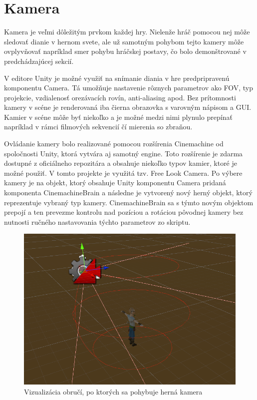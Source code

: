 \documentclass[slovak, master]{diploma}
\begin{document}
\section{Kamera}
\label{sec:Camera}
Kamera je veľmi dôležitým prvkom každej hry. Nielenže hráč pomocou nej môže sledovať dianie v hernom svete, ale už samotným pohybom tejto kamery môže ovplyvňovať napríklad smer pohybu hráčskej postavy, čo bolo demonštrované v predchádzajúcej sekcií. 

V editore Unity je možné využiť na snímanie diania v hre predpripravenú komponentu Camera. Tá umožňuje nastavenie rôznych parametrov ako FOV, typ projekcie, vzdialenosť orezávacích rovín, anti-aliasing apod. Bez prítomnosti kamery v scéne je renderovaná iba čierna obrazovka s varovným nápisom a GUI. Kamier v scéne môže byť niekoľko a je možné medzi nimi plynulo prepínať napríklad v rámci filmových sekvencií čí mierenia so zbraňou.

Ovládanie kamery bolo realizované pomocou rozšírenia Cinemachine od spoločnosti Unity, ktorá vytvára aj samotný engine. Toto rozšírenie je zdarma dostupné z oficiálneho repozitára a obsahuje niekoľko typov kamier, ktoré je možné použiť. V tomto projekte je využitá tzv. Free Look Camera. Po výbere kamery je na objekt, ktorý obsahuje Unity komponentu Camera pridaná komponenta CinemachineBrain a následne je vytvorený nový herný objekt, ktorý reprezentuje vybraný typ kamery. CinemachineBrain sa s týmto novým objektom prepojí a ten prevezme kontrolu nad pozíciou a rotáciou pôvodnej kamery bez nutnosti ručného nastavovania týchto parametrov zo skriptu.

\begin{figure}[!htbp]
    \centering
    \includegraphics[width=.85\textwidth]{Figures/obruce.png}
    \caption{Vizualizácia obručí, po ktorých sa pohybuje herná kamera}
    \label{pic:Cinemachine}
\end{figure}
\end{document}
